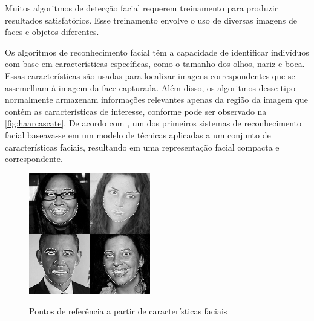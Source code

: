 Muitos algoritmos de detecção facial requerem treinamento para produzir resultados 
satisfatórios. Esse treinamento envolve o uso de diversas imagens de faces 
e objetos diferentes.

Os algoritmos de reconhecimento facial têm a capacidade de identificar indivíduos com 
base em características específicas, como o tamanho dos olhos, nariz e boca. Essas 
características são usadas para localizar imagens correspondentes que se assemelham 
à imagem da face capturada. Além disso, os algoritmos desse tipo normalmente armazenam 
informações relevantes apenas da região da imagem que contém as características de 
interesse, conforme pode ser observado na \autoref{fig:haarcascate}. De acordo 
com \cite{brunelli1993}, um dos primeiros sistemas de reconhecimento 
facial baseava-se em um modelo de técnicas aplicadas a um conjunto de características 
faciais, resultando em uma representação facial compacta e correspondente.

\begin{figure}[h!]
    \centering
    \caption{Pontos de referência a partir de características faciais}
    \includegraphics[scale=0.9]{figuras/facereg.jpg}
    \label{fig:facereg}
    \centering
\end{figure}